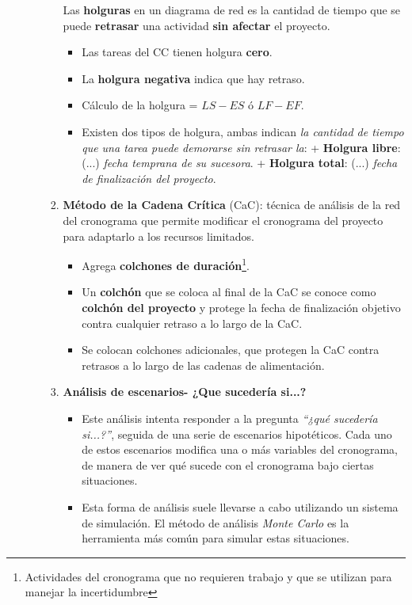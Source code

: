 \documentclass[10pt,a4paper]{article}
\begin{document}
\begin{itemize}
\begin{itemize}
\begin{enumerate}
Las \textbf{holguras} en un diagrama de red es la cantidad de tiempo que se puede \textbf{retrasar} una actividad \textbf{sin afectar} el proyecto.

\begin{itemize}
\item Las tareas del CC tienen holgura \textbf{cero}.
\item La \textbf{holgura negativa} indica que hay retraso.
\item Cálculo de la holgura = $LS-ES$ ó $LF-EF$.
\item Existen dos tipos de holgura, ambas indican \textit{la cantidad de tiempo que una tarea puede demorarse sin retrasar la}:
\subitem + \textbf{Holgura libre}: (...) \textit{fecha temprana de su sucesora}.
\subitem + \textbf{Holgura total}: (...) \textit{fecha de finalización del proyecto}.
\end{itemize}

\item \textbf{Método de la Cadena Crítica} (CaC): técnica de análisis de la red del cronograma que permite modificar el cronograma del proyecto para adaptarlo a los recursos limitados.
\begin{itemize}
\item Agrega \textbf{colchones de duración}\footnote{Actividades del cronograma que no requieren trabajo y que se utilizan para manejar la incertidumbre}.
\item Un \textbf{colchón} que se coloca al final de la CaC se conoce como \textbf{colchón del proyecto} y protege la fecha de finalización objetivo contra cualquier retraso a lo largo de la CaC.
\item Se colocan colchones adicionales, que protegen la CaC contra retrasos a lo largo de las cadenas de alimentación.
\end{itemize}

\item \textbf{Análisis de escenarios- ¿Que sucedería si...?}
\begin{itemize}
\item Este análisis intenta responder a la pregunta \textit{“¿qué sucedería si...?”}, seguida de una serie de escenarios hipotéticos. Cada uno de estos escenarios modifica una o más variables del cronograma, de manera de ver qué sucede con el cronograma bajo ciertas situaciones.
\item Esta forma de análisis suele llevarse a cabo utilizando un sistema de simulación. El método de análisis \textit{Monte Carlo} es la herramienta más común para simular estas situaciones.
\end{itemize}


\end{enumerate}
\end{itemize}
\end{itemize}
\end{document}

